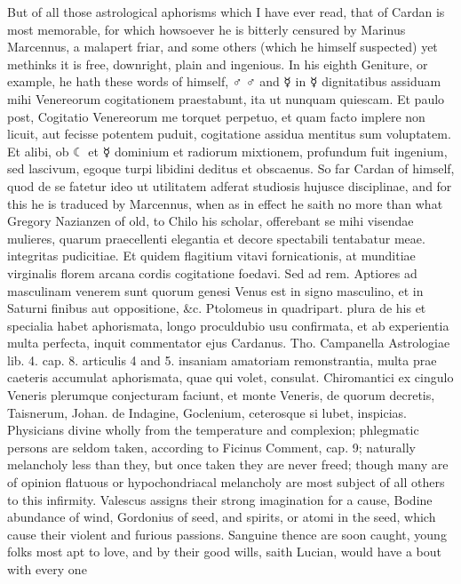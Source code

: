 {But of all those astrological aphorisms which I have ever read, that of
Cardan is most memorable, for which howsoever he is bitterly censured
by Marinus Marcennus, a malapert friar, and some others (which
 he himself suspected) yet methinks it is free, downright, plain
and ingenious. In his eighth Geniture, or example, he hath these
words of himself, ♂ ♂ and ☿ in ☿ dignitatibus assiduam mihi Venereorum
cogitationem praestabunt, ita ut nunquam quiescam. Et paulo post,
Cogitatio Venereorum me torquet perpetuo, et quam facto implere non
licuit, aut fecisse potentem puduit, cogitatione assidua mentitus sum
voluptatem. Et alibi, ob ☾ et ☿ dominium et radiorum mixtionem,
profundum fuit ingenium, sed lascivum, egoque turpi libidini deditus et
obscaenus. So far Cardan of himself, quod de se fatetur ideo ut
utilitatem adferat studiosis hujusce disciplinae, and for this he is
traduced by Marcennus, when as in effect he saith no more than what
Gregory Nazianzen of old, to Chilo his scholar, offerebant se mihi
visendae mulieres, quarum praecellenti elegantia et decore spectabili
tentabatur meae. integritas pudicitiae. Et quidem flagitium vitavi
fornicationis, at munditiae virginalis florem arcana cordis cogitatione
foedavi. Sed ad rem. Aptiores ad masculinam venerem sunt quorum genesi
Venus est in signo masculino, et in Saturni finibus aut oppositione,
\&c. Ptolomeus in quadripart. plura de his et specialia habet
aphorismata, longo proculdubio usu confirmata, et ab experientia multa
perfecta, inquit commentator ejus Cardanus. Tho. Campanella Astrologiae
lib. 4. cap. 8. articulis 4 and 5. insaniam amatoriam remonstrantia,
multa prae caeteris accumulat aphorismata, quae qui volet, consulat.
Chiromantici ex cingulo Veneris plerumque conjecturam faciunt, et monte
Veneris, de quorum decretis, Taisnerum, Johan. de Indagine, Goclenium,
ceterosque si lubet, inspicias. Physicians divine wholly from the
temperature and complexion; phlegmatic persons are seldom taken,
according to Ficinus Comment, cap. 9; naturally melancholy less than
they, but once taken they are never freed; though many are of opinion
flatuous or hypochondriacal melancholy are most subject of all others
to this infirmity. Valescus assigns their strong imagination for a
cause, Bodine abundance of wind, Gordonius of seed, and spirits, or
atomi in the seed, which cause their violent and furious passions.
Sanguine thence are soon caught, young folks most apt to love, and by
their good wills, saith Lucian, would have a bout with every one
}
